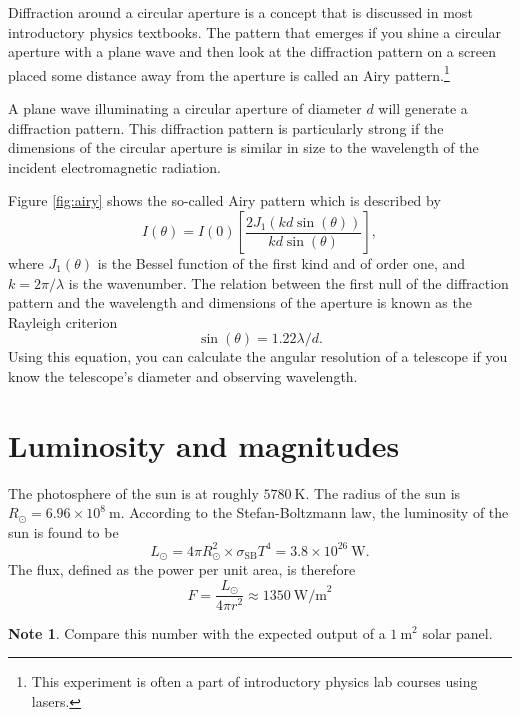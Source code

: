 \documentclass[a4paper,12pt]{article}
\theoremstyle{remark}
\newcommand{\mrm}[1]{\mathrm{#1}}
\renewcommand{\=}[1]{\stackrel{#1}{=}} %
\theoremstyle{plain}
\theoremstyle{definition}
\newtheorem*{definitionT}{Note}%
\newenvironment{note}{
\begin{dBox}
\begin{definitionT}}
{\end{definitionT}
\end{dBox}}
\begin{document}
Diffraction around a circular aperture is a concept that is discussed in most introductory physics textbooks. The pattern that emerges if you shine a circular aperture with a plane wave and then look at the diffraction pattern on a screen placed some distance away from the aperture is called an Airy pattern.\footnote{This experiment is often a part of introductory physics lab courses using lasers.}

A plane wave illuminating a circular aperture of diameter $d$ will generate a diffraction pattern. This diffraction pattern is particularly strong if the dimensions of the circular aperture is similar in size to the wavelength of the incident electromagnetic radiation.

Figure \ref{fig:airy} shows the so-called Airy pattern which is described by 
\begin{equation}
I(\theta) = I(0) \left[ \frac{2J_1(kd\sin(\theta))}{kd\sin(\theta)} \right],
\end{equation}
where $J_1(\theta)$ is the Bessel function of the first kind and of order one, and $k = 2\pi/\lambda$ is the wavenumber. The relation between the first null of the diffraction pattern and the wavelength and dimensions of the aperture is known as the Rayleigh criterion
\begin{equation}
\sin (\theta) = 1.22 \lambda /d.
\end{equation}
Using this equation, you can calculate the angular resolution of a telescope if you know the telescope's diameter and observing wavelength.


\section{Luminosity and magnitudes}
The photosphere of the sun is at roughly $5780 \:\mrm{K}$. The radius of the sun is $R_\odot = 6.96 \times 10^{8} \:\mrm{m}$. According to the Stefan-Boltzmann law, the luminosity of the sun is found to be
\begin{equation}
L _\odot = 4\pi R_\odot ^{2} \times \sigma _\mrm{SB} T^{4} = 3.8 \times 10^{26} \:\mrm{W}.
\end{equation}
The flux, defined as the power per unit area, is therefore
\begin{equation}
F = \frac{L_\odot}{4\pi r^{2}} \approx 1350 \:\mrm{W/m}^{2}
\end{equation}
\begin{note}
Compare this number with the expected output of a $1 \:\mrm{m}^{2}$ solar panel.
\end{note}
\end{document}
